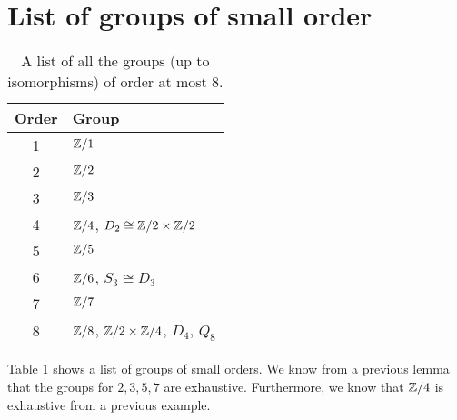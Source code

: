 \section{List of groups of small order}

\begin{table}[]
    \centering
    \caption{A list of all the groups (up to isomorphisms) of order at most 8.}
    \label{tab:small-groups}
    \begin{tabular}{cl}
        \toprule
        Order & Group \\
        \midrule
        1 & $\mathbb{Z}/1$ \\
        2 & $\mathbb{Z}/2$ \\
        3 & $\mathbb{Z}/3$ \\
        4 & $\mathbb{Z}/4$, $D_2 \cong \mathbb{Z}/2 \times \mathbb{Z}/2$ \\
        5 & $\mathbb{Z}/5$ \\
        6 & $\mathbb{Z}/6$, $S_3 \cong D_3$ \\
        7 & $\mathbb{Z}/7$ \\
        8 & $\mathbb{Z}/8$, $\mathbb{Z}/2 \times \mathbb{Z}/4$, $D_4$, $Q_8$ \\
        \bottomrule
    \end{tabular}
\end{table}

Table \ref{tab:small-groups} shows a list of groups of small orders.
We know from a previous lemma that the groups for $2,3,5,7$ are exhaustive.
Furthermore, we know that $\mathbb{Z}/4$ is exhaustive from a previous example.
